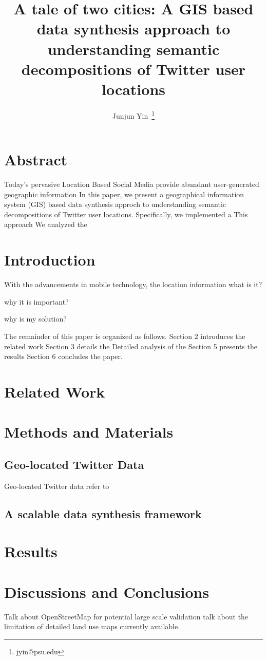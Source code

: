 \documentclass[a4paper,11pt]{article}
\begin{document}
\title{A tale of two cities: A GIS based data synthesis approach to understanding semantic decompositions of Twitter user locations}
\author{Junjun Yin~\thanks{jyin@psu.edu}}
\renewcommand\Authands{ and }
\maketitle

\section*{Abstract}
Today's pervasive Location Based Social Media provide abundant user-generated geographic information
In this paper, we present a geographical information system (GIS) based data synthesis approch to understanding semantic decompositions of Twitter user locations.
Specifically, we implemented a
This approach 
We analyzed the 

\section{Introduction}



With the advancements in mobile technology, the location information 
what is it?

why it is important?

why is my solution?

The remainder of this paper is organized as follows. Section 2 introduces the related work 
Section 3 details the 
Detailed analysis of the
Section 5 presents the results
Section 6 concludes the paper.

\section{Related Work}



\section{Methods and Materials}
\subsection{Geo-located Twitter Data}
Geo-located Twitter data refer to  


\subsection{A scalable data synthesis framework}


\section{Results}


\section{Discussions and Conclusions}
Talk about OpenStreetMap for potential large scale validation
talk about the limitation of detailed land use maps currently available.





\end{document}
